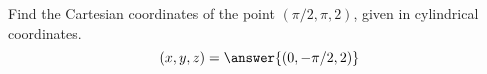 \begin{problem}
Find the Cartesian coordinates of the point $(\pi/2, \pi, 2)$, given in cylindrical coordinates.
\[
(x,y,z) = \answer{(0, -\pi/2, 2)}
\]
\end{problem}